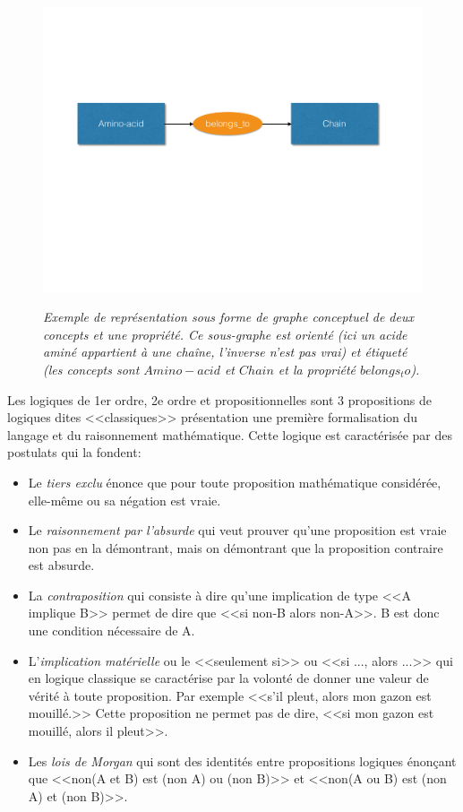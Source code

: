 \begin{figure}
  \centering
  {\includegraphics[width=.6\linewidth]{./figures/ch2/conceptual_graph}}
    \caption{\it Exemple de représentation sous forme de graphe conceptuel de deux concepts et une propriété. Ce sous-graphe est orienté (ici un acide aminé appartient à une chaîne, l'inverse n'est pas vrai) et étiqueté (les concepts sont $Amino-acid$ et $Chain$ et la propriété $belongs_to$).}
  \label{Fig:conceptual_graph}
  \hspace{0.5cm}
\end{figure}


Les logiques de 1er ordre, 2e ordre et propositionnelles sont 3 propositions de logiques dites <<classiques>> présentation une première formalisation du langage et du raisonnement mathématique. Cette logique est caractérisée par des postulats qui la fondent:

\begin{itemize}
  \item Le \textit{tiers exclu} énonce que pour toute proposition mathématique considérée, elle-même ou sa négation est vraie.
  \item Le \textit{raisonnement par l'absurde} qui veut prouver qu'une proposition est vraie non pas en la démontrant, mais on démontrant que la proposition contraire est absurde.
  \item La \textit{contraposition} qui consiste à dire qu'une implication de type <<A implique B>> permet de dire que <<si non-B alors non-A>>. B est donc une condition nécessaire de A.
  \item L'\textit{implication matérielle} ou le <<seulement si>> ou <<si ..., alors ...>> qui en logique classique se caractérise par la volonté de donner une valeur de vérité à toute proposition. Par exemple <<s'il pleut, alors mon gazon est mouillé.>> Cette proposition ne permet pas de dire, <<si mon gazon est mouillé, alors il pleut>>.
  \item Les \textit{lois de Morgan} qui sont des identités entre propositions logiques énonçant que <<non(A et B) est (non A) ou (non B)>> et <<non(A ou B) est (non A) et (non B)>>.
\end{itemize}

